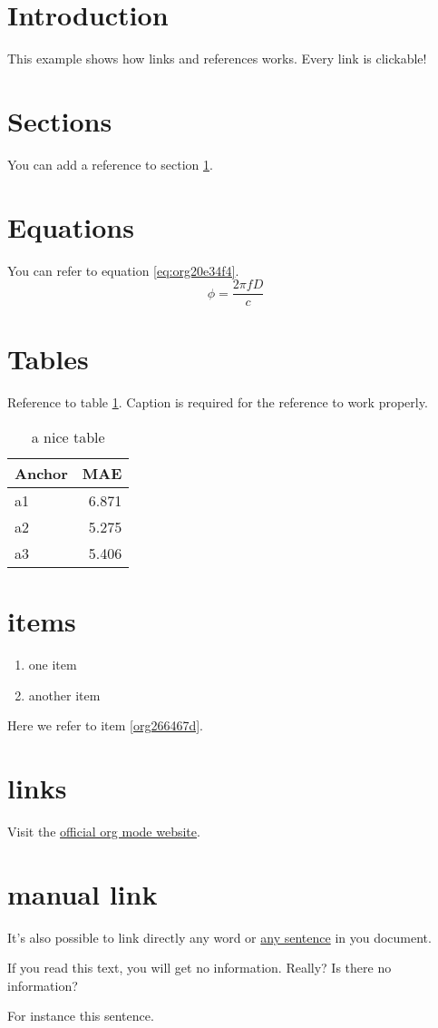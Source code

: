 


\section{Introduction}
\label{sec:org86e35a6}
This example shows how links and references works.
Every link is clickable!

\section{Sections}
\label{sec:org007aa79}
You can add a reference to section \ref{sec:org86e35a6}.

\section{Equations}
\label{sec:org658e9b5}
You can refer to equation \ref{eq:org20e34f4}.
\begin{equation}
\label{eq:org20e34f4}
\phi = \frac{2\pi fD}{c}
\end{equation}

\section{Tables}
\label{sec:org1c463a1}
Reference to table \ref{tab:org52ca7cb}.
Caption is required for the reference to work properly.

\begin{table}[htbp]
\caption{\label{tab:org52ca7cb}
a nice table}
\centering
\begin{tabular}{lr}
Anchor & MAE\\
\hline
a1 & 6.871\\
a2 & 5.275\\
a3 & 5.406\\
\end{tabular}
\end{table}

\section{items}
\label{sec:org4d35f61}
\begin{enumerate}
\item one item
\item \label{org266467d}another item
\end{enumerate}
Here we refer to item \ref{org266467d}.

\section{links}
\label{sec:orge845142}
Visit the \href{https://orgmode.org/}{official org mode website}.

\section{manual link}
\label{sec:org8eac70d}
It's also possible to link directly any word
or \hyperlink{thesentence}{any sentence} in you document.

If you read this text, you will get no information.  Really?
Is there no information?

For instance \hypertarget{thesentence}{this sentence}.


